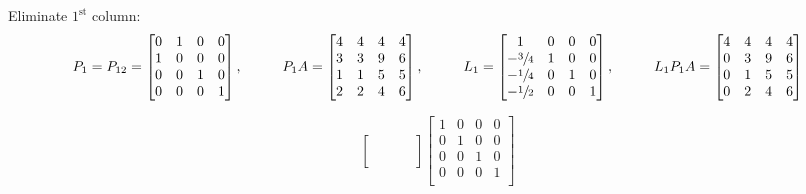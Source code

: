 \documentclass[12pt]{article}
\begin{document}
Eliminate $1^\text{st}$ column:\\
$$
    P_1 = P_{12} =
    \begin{bmatrix}
        0 & 1 & 0 & 0 \\
        1 & 0 & 0 & 0 \\
        0 & 0 & 1 & 0 \\
        0 & 0 & 0 & 1 \\
    \end{bmatrix},\hspace*{1cm}
    P_1A=
    \begin{bmatrix}
        4 & 4 & 4 & 4 \\
        3 & 3 & 9 & 6 \\
        1 & 1 & 5 & 5 \\
        2 & 2 & 4 & 6 \\
    \end{bmatrix},\hspace*{1cm}
    L_1=
    \begin{bmatrix}
        1             & 0 & 0 & 0 \\
        -\sfrac{3}{4} & 1 & 0 & 0 \\
        -\sfrac{1}{4} & 0 & 1 & 0 \\
        -\sfrac{1}{2} & 0 & 0 & 1 \\
    \end{bmatrix},\hspace*{1cm}
    L_1P_1A=
    \begin{bmatrix}
        4 & 4 & 4 & 4 \\
        0 & 3 & 9 & 6 \\
        0 & 1 & 5 & 5 \\
        0 & 2 & 4 & 6 \\
    \end{bmatrix}
$$

$$
    \begin{bmatrix}
         &  &  & \\
         &  &  & \\
         &  &  & \\
         &  &  & \\
    \end{bmatrix}
    \begin{bmatrix}
        1 & 0 & 0 & 0 \\
        0 & 1 & 0 & 0 \\
        0 & 0 & 1 & 0 \\
        0 & 0 & 0 & 1 \\
    \end{bmatrix}
$$
\end{document}
